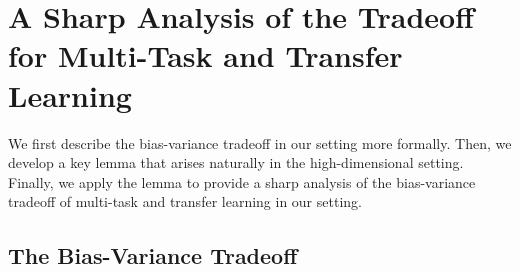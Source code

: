 \section{A Sharp Analysis of the Tradeoff for Multi-Task and Transfer Learning}
\label{sec_main}

We first describe the bias-variance tradeoff in our setting more formally.
Then, we develop a key lemma that arises naturally in the high-dimensional setting.
Finally, we apply the lemma to provide a sharp analysis of the bias-variance tradeoff of multi-task and transfer learning in our setting.

\subsection{The Bias-Variance Tradeoff}\label{sec_setup}

